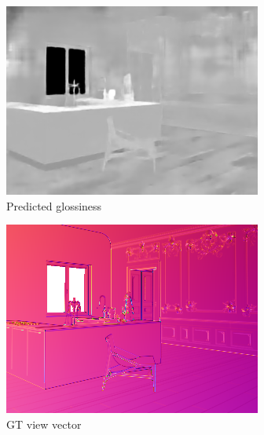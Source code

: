 \begin{figure}
\begin{subfigure}{0.32\linewidth}
    \includegraphics[width=\linewidth]{praca/images/AI43_004_Cam02.glossiness_output.png}
    \caption{Predicted glossiness}
  \end{subfigure}
  \begin{subfigure}{0.32\linewidth}
    \includegraphics[width=\linewidth]{praca/images/AI43_004_Cam02.view.png}
    \caption{GT view vector}
  \end{subfigure}
  \begin{subfigure}{0.32\linewidth}

\end{subfigure}
\end{figure}
